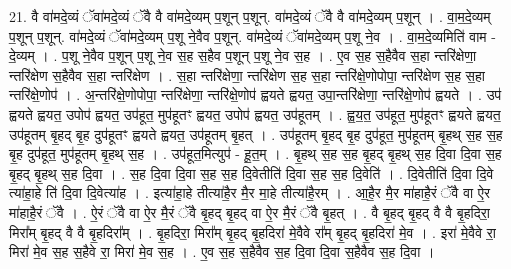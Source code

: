 \documentclass[17pt]{extarticle}
\begin{document}
21. वै वा॑मदे॒व्यं ॅवा॑मदे॒व्यं ॅवै वै वा॑मदे॒व्यम् प॒शून् प॒शून्. वा॑मदे॒व्यं ॅवै वै वा॑मदे॒व्यम् प॒शून् । . वा॒म॒दे॒व्यम् प॒शून् प॒शून्. वा॑मदे॒व्यं ॅवा॑मदे॒व्यम् प॒शू ने॒वैव प॒शून्. वा॑मदे॒व्यं ॅवा॑मदे॒व्यम् प॒शू ने॒व । . वा॒म॒दे॒व्यमिति॑ वाम - दे॒व्यम् । . प॒शू ने॒वैव प॒शून् प॒शू ने॒व स॒ह स॒हैव प॒शून् प॒शू ने॒व स॒ह । . ए॒व स॒ह स॒हैवैव स॒हा न्तरि॑क्षेणा॒ न्तरि॑क्षेण स॒हैवैव स॒हा न्तरि॑क्षेण । . स॒हा न्तरि॑क्षेणा॒ न्तरि॑क्षेण स॒ह स॒हा न्तरि॑क्षे॒णोपोपा॒ न्तरि॑क्षेण स॒ह स॒हा न्तरि॑क्षे॒णोप॑ । . अ॒न्तरि॑क्षे॒णोपोपा॒ न्तरि॑क्षेणा॒ न्तरि॑क्षे॒णोप॑ ह्वयते ह्वयत॒ उपा॒न्तरि॑क्षेणा॒ न्तरि॑क्षे॒णोप॑ ह्वयते । . उप॑ ह्वयते ह्वयत॒ उपोप॑ ह्वयत॒ उप॑हूत॒ मुप॑हूतꣳ ह्वयत॒ उपोप॑ ह्वयत॒ उप॑हूतम् । . ह्व॒य॒त॒ उप॑हूत॒ मुप॑हूतꣳ ह्वयते ह्वयत॒ उप॑हूतम् बृ॒हद् बृ॒ह दुप॑हूतꣳ ह्वयते ह्वयत॒ उप॑हूतम् बृ॒हत् । . उप॑हूतम् बृ॒हद् बृ॒ह दुप॑हूत॒ मुप॑हूतम् बृ॒हथ् स॒ह स॒ह बृ॒ह दुप॑हूत॒ मुप॑हूतम् बृ॒हथ् स॒ह । . उप॑हूत॒मित्युप॑ - हू॒त॒म् । . बृ॒हथ् स॒ह स॒ह बृ॒हद् बृ॒हथ् स॒ह दि॒वा दि॒वा स॒ह बृ॒हद् बृ॒हथ् स॒ह दि॒वा । . स॒ह दि॒वा दि॒वा स॒ह स॒ह दि॒वेतीति॑ दि॒वा स॒ह स॒ह दि॒वेति॑ । . दि॒वेतीति॑ दि॒वा दि॒वे त्या॑हा॒हे ति॑ दि॒वा दि॒वेत्या॑ह । . इत्या॑हा॒हे तीत्या॑है॒र मै॒र मा॒हे तीत्या॑है॒रम् । . आ॒है॒र मै॒र मा॑हाहै॒रं ॅवै वा ऐ॒र मा॑हाहै॒रं ॅवै । . ऐ॒रं ॅवै वा ऐ॒र मै॒रं ॅवै बृ॒हद् बृ॒हद् वा ऐ॒र मै॒रं ॅवै बृ॒हत् । . वै बृ॒हद् बृ॒हद् वै वै बृ॒हदिरा॒ मिरा᳚म् बृ॒हद् वै वै बृ॒हदिरा᳚म् । . बृ॒हदिरा॒ मिरा᳚म् बृ॒हद् बृ॒हदिरा॑ मे॒वैवे रा᳚म् बृ॒हद् बृ॒हदिरा॑ मे॒व । . इरा॑ मे॒वैवे रा॒ मिरा॑ मे॒व स॒ह स॒हैवे रा॒ मिरा॑ मे॒व स॒ह । . ए॒व स॒ह स॒हैवैव स॒ह दि॒वा दि॒वा स॒हैवैव स॒ह दि॒वा । \newline
\end{document}
